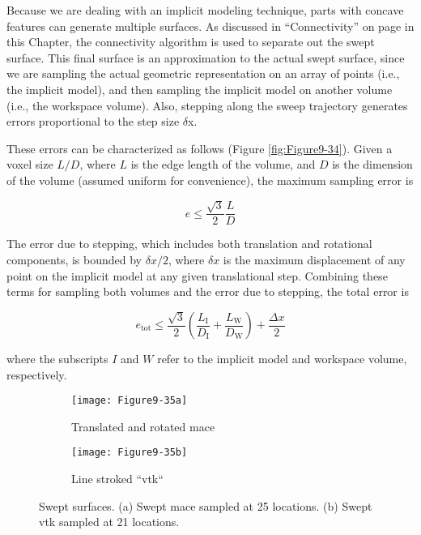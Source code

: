 Because we are dealing with an implicit modeling technique, parts with concave features can generate multiple surfaces. As discussed in ``Connectivity'' on page \pageref{subsec:connectivity} in this Chapter, the connectivity algorithm is used to separate out the swept surface. This final surface is an approximation to the actual swept surface, since we are sampling the actual geometric representation on an array of points (i.e., the implicit model), and then sampling the implicit model on another volume (i.e., the workspace volume). Also, stepping along the sweep trajectory generates errors proportional to the step size $\delta$x.

These errors can be characterized as follows (Figure \ref{fig:Figure9-34}). Given a voxel size $L/D$, where $L$ is the edge length of the volume, and $D$ is the dimension of the volume (assumed uniform for convenience), the maximum sampling error is

\begin{equation}\label{eq:9.20}
e \leq \dfrac{\sqrt{3}}{2} \dfrac{L}{D}
\end{equation}

The error due to stepping, which includes both translation and rotational components, is bounded by $\delta x / 2$, where $\delta x$ is the maximum displacement of any point on the implicit model at any given translational step. Combining these terms for sampling both volumes and the error due to stepping, the total error is

\begin{equation}\label{eq:9.21}
e_\text{tot} \leq \dfrac{\sqrt{3}}{2}\left( \dfrac{L_\text{I}}{D_\text{I}}
  + \dfrac{L_\text{W}}{D_\text{W}}\right) + \dfrac{\Delta x}{2}
\end{equation}

\noindent where the subscripts $I$ and $W$ refer to the implicit model and workspace volume, respectively.

\begin{figure}[htb]
    \centering
	\begin{subfigure}[h]{0.48\linewidth}
		\texttt{[image: Figure9-35a]}
		\captionsetup{justification=centering}
		\caption{Translated and rotated mace}
		\label{fig:Figure9-35a}
	\end{subfigure}
	\hfill
	\begin{subfigure}[h]{0.48\linewidth}
		\texttt{[image: Figure9-35b]}
		\captionsetup{justification=centering}
		\caption{Line stroked ``vtk``}
		\label{fig:Figure9-35b}
	\end{subfigure}
	\caption{Swept surfaces. (a) Swept mace sampled at 25 locations. (b) Swept vtk sampled at 21 locations.}\label{fig:Figure9-35}
\end{figure}

